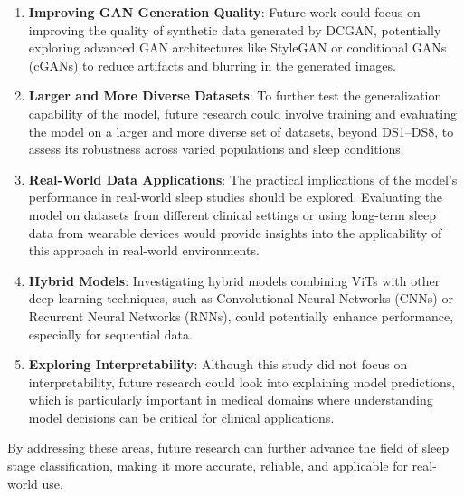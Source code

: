 \begin{enumerate}
    \item \textbf{Improving GAN Generation Quality}: Future work could focus on improving the quality of synthetic data generated by DCGAN, potentially exploring advanced GAN architectures like StyleGAN or conditional GANs (cGANs) to reduce artifacts and blurring in the generated images.
    \item \textbf{Larger and More Diverse Datasets}: To further test the generalization capability of the model, future research could involve training and evaluating the model on a larger and more diverse set of datasets, beyond DS1–DS8, to assess its robustness across varied populations and sleep conditions.
    \item \textbf{Real-World Data Applications}: The practical implications of the model’s performance in real-world sleep studies should be explored. Evaluating the model on datasets from different clinical settings or using long-term sleep data from wearable devices would provide insights into the applicability of this approach in real-world environments.
    \item \textbf{Hybrid Models}: Investigating hybrid models combining ViTs with other deep learning techniques, such as Convolutional Neural Networks (CNNs) or Recurrent Neural Networks (RNNs), could potentially enhance performance, especially for sequential data.
    \item \textbf{Exploring Interpretability}: Although this study did not focus on interpretability, future research could look into explaining model predictions, which is particularly important in medical domains where understanding model decisions can be critical for clinical applications.
\end{enumerate}
By addressing these areas, future research can further advance the field of sleep stage classification, making it more accurate, reliable, and applicable for real-world use. \cite{mohomed2024nocturne}

 